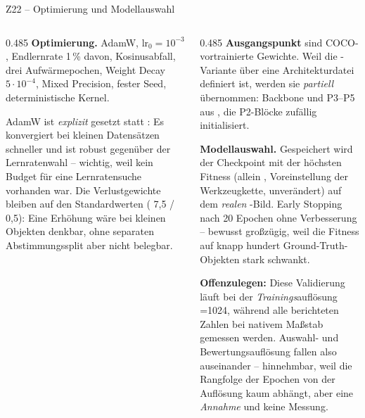 \documentclass[14pt,aspectratio=169]{beamer}
\begin{document}
\begin{frame}{Z22 -- Optimierung und Modellauswahl}
\zusatzdicht
\begin{columns}[T,onlytextwidth]
\begin{column}{0.485\textwidth}
\textbf{Optimierung.} AdamW, $\text{lr}_0 = 10^{-3}$, Endlernrate 1\,\%
davon, Kosinusabfall, drei Aufwärmepochen, Weight Decay $5\cdot10^{-4}$,
Mixed Precision, fester Seed, deterministische Kernel.
\smallskip

AdamW ist \emph{explizit} gesetzt statt : Es konvergiert bei
kleinen Datensätzen schneller und ist robust gegenüber der Lernratenwahl --
wichtig, weil kein Budget für eine Lernratensuche vorhanden war. Die
Verlustgewichte bleiben auf den Standardwerten ( 7{,}5 /
 0{,}5): Eine Erhöhung wäre bei kleinen Objekten denkbar, ohne
separaten Abstimmungssplit aber nicht belegbar.
\end{column}
\begin{column}{0.485\textwidth}
\textbf{Ausgangspunkt} sind COCO-vortrainierte Gewichte. Weil die
-Variante über eine Architekturdatei definiert ist, werden sie
\emph{partiell} übernommen: Backbone und P3--P5 aus , die
P2-Blöcke zufällig initialisiert.
\smallskip

\textbf{Modellauswahl.} Gespeichert wird der Checkpoint mit der höchsten
Fitness (allein \mAPall, Voreinstellung der Werkzeugkette,
unverändert) auf dem \emph{realen} -Bild. Early
Stopping nach 20 Epochen ohne Verbesserung -- bewusst großzügig, weil die
Fitness auf knapp hundert Ground-Truth-Objekten stark schwankt.
\smallskip

{\color{warn}\textbf{Offenzulegen:}} Diese Validierung läuft bei der
\emph{Trainings}auflösung =1024, während alle berichteten Zahlen
bei nativem Maßstab gemessen werden. Auswahl- und Bewertungsauflösung fallen
also auseinander -- hinnehmbar, weil die Rangfolge der Epochen von der
Auflösung kaum abhängt, aber eine \emph{Annahme} und keine Messung.
\end{column}
\end{columns}
\end{frame}
\end{document}
